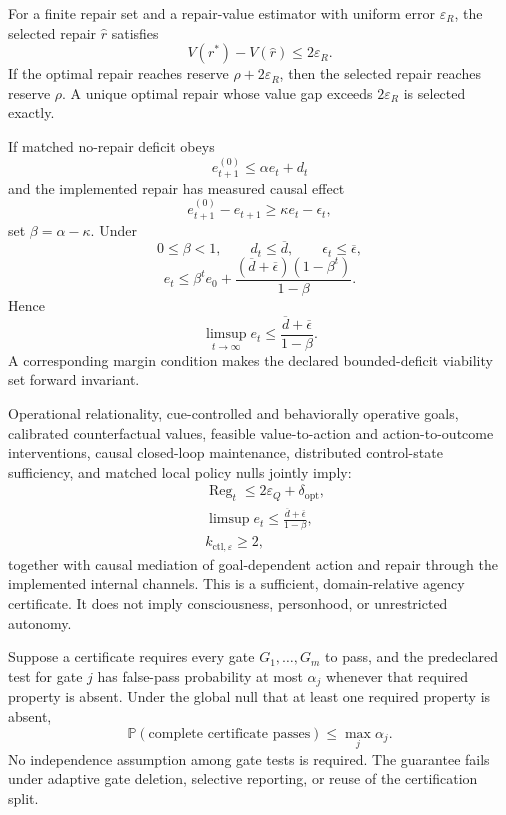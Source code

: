
For a finite repair set and a repair-value estimator with uniform error
\(\varepsilon_R\), the selected repair \(\widehat r\) satisfies
\[
\boxed{
V(r^*)-V(\widehat r)
\leq
2\varepsilon_R.
}
\]
If the optimal repair reaches reserve \(\rho+2\varepsilon_R\), then the selected
repair reaches reserve \(\rho\). A unique optimal repair whose value gap
exceeds \(2\varepsilon_R\) is selected exactly.


If matched no-repair deficit obeys
\[
e_{t+1}^{(0)}\leq\alpha e_t+d_t
\]
and the implemented repair has measured causal effect
\[
e_{t+1}^{(0)}-e_{t+1}\geq\kappa e_t-\epsilon_t,
\]
set \(\beta=\alpha-\kappa\). Under
\[
0\leq\beta<1,
\qquad
 d_t\leq\overline d,
\qquad
 \epsilon_t\leq\overline\epsilon,
\]
\[
\boxed{
e_t
\leq
\beta^te_0
+
\frac{(\overline d+\overline\epsilon)(1-\beta^t)}{1-\beta}.
}
\]
Hence
\[
\limsup_{t\to\infty}e_t
\leq
\frac{\overline d+\overline\epsilon}{1-\beta}.
\]
A corresponding margin condition makes the declared bounded-deficit viability
set forward invariant.


Operational relationality, cue-controlled and behaviorally operative goals,
calibrated counterfactual values, feasible value-to-action and action-to-outcome
interventions, causal closed-loop maintenance, distributed control-state
sufficiency, and matched local policy nulls jointly imply:
\[
\begin{aligned}
&\operatorname{Reg}_t\leq2\varepsilon_Q+\delta_{\mathrm{opt}},\\
&\limsup e_t\leq
 \frac{\overline d+\overline\epsilon}{1-\beta},\\
&k_{\mathrm{ctl},\varepsilon}\geq2,
\end{aligned}
\]
together with causal mediation of goal-dependent action and repair through the
implemented internal channels. This is a sufficient, domain-relative agency
certificate. It does not imply consciousness, personhood, or unrestricted
autonomy.


Suppose a certificate requires every gate \(G_1,\ldots,G_m\) to pass, and the
predeclared test for gate \(j\) has false-pass probability at most \(\alpha_j\)
whenever that required property is absent. Under the global null that at least
one required property is absent,
\[
\boxed{
\mathbb P(\text{complete certificate passes})
\leq
\max_j\alpha_j.
}
\]
No independence assumption among gate tests is required. The guarantee fails
under adaptive gate deletion, selective reporting, or reuse of the
certification split.


